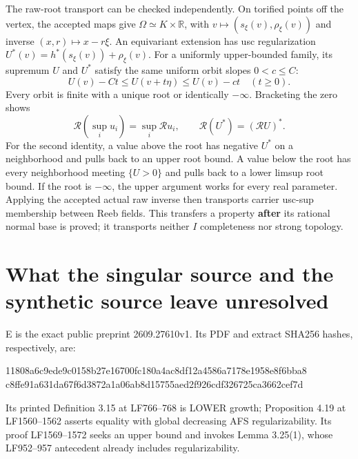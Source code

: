 \documentclass[
  10pt,
]{article}
\newenvironment{Shaded}{}{}
\newcommand{\NormalTok}[1]{#1}
\begin{document}
The raw-root transport can be checked independently. On torified points
off the vertex, the accepted maps give
\(\Omega\simeq K\times\mathbb R\), with
\(v\mapsto(s_\xi(v),\rho_\xi(v))\) and inverse \((x,r)\mapsto x-r\xi\).
An equivariant extension has usc regularization
\(U^*(v)=h^*(s_\xi(v))+\rho_\xi(v)\). For a uniformly upper-bounded
family, its supremum \(U\) and \(U^*\) satisfy the same uniform orbit
slopes \(0<c\le C\): \[U(v)-Ct\le U(v+t\eta)\le U(v)-ct\quad(t\ge0).\]
Every orbit is finite with a unique root or identically \(-\infty\).
Bracketing the zero shows
\[\mathcal R(\sup_i u_i)=\sup_i\mathcal R u_i,\qquad
 \mathcal R(U^*)=(\mathcal R U)^*. \tag{46}\] For the second identity, a
value above the root has negative \(U^*\) on a neighborhood and pulls
back to an upper root bound. A value below the root has every
neighborhood meeting \(\{U>0\}\) and pulls back to a lower limsup root
bound. If the root is \(-\infty\), the upper argument works for every
real parameter. Applying the accepted actual raw inverse then transports
carrier usc-sup membership between Reeb fields. This transfers a
property \textbf{after} its rational normal base is proved; it
transports neither \(I\) completeness nor strong topology.

\section{What the singular source and the synthetic source leave
unresolved}\label{what-the-singular-source-and-the-synthetic-source-leave-unresolved}

E is the exact public preprint 2609.27610v1. Its PDF and extract SHA256
hashes, respectively, are:

\begin{Shaded}
\begin{Highlighting}[]
\NormalTok{11808a6c9ede9c0158b27e16700fc180a4ac8df12a4586a7178e1958e8f6bba8}
\NormalTok{c8ffe91a631da67f6d3872a1a06ab8d15755aed2f926cdf326725ca3662cef7d}
\end{Highlighting}
\end{Shaded}

Its printed Definition 3.15 at LF766--768 is LOWER growth; Proposition
4.19 at LF1560--1562 asserts equality with global decreasing AFS
regularizability. Its proof LF1569--1572 seeks an upper bound and
invokes Lemma 3.25(1), whose LF952--957 antecedent already includes
regularizability.
\end{document}
